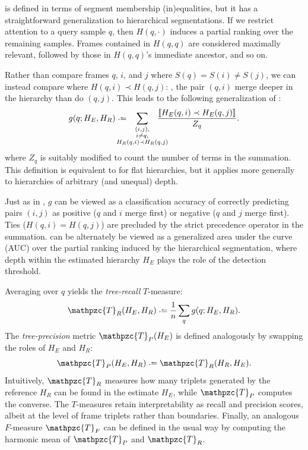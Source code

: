 \documentclass{article}
\def\shag{\ensuremath{\mathpzc{T}}}
\begin{document}
 is defined in terms of segment membership (in)equalities, but it has a straightforward 
generalization to hierarchical segmentations.
If we restrict attention to a query sample $q$, then $H(q, \cdot)$ induces a partial ranking over the remaining samples.
Frames contained in $H(q, q)$ are considered maximally relevant, followed by those in $H(q, q)$'s immediate ancestor, and so on.

Rather than compare frames $q$, $i$, and $j$ where ${S(q) = S(i) \neq S(j)}$, we can instead compare where
$H(q, i) \prec H(q, j)$: \ie, the pair $(q,i)$ merge deeper in the hierarchy than do $(q,j)$.
This leads to the following generalization of :
\begin{equation}
    g(q ; H_E, H_R) \defeq \hspace{-1.5em} \sum_{\substack{(i, j),\\ i \neq q,\\ H_R(q, i) \prec H_R(q, j)}}
    \hspace{-1.5em} \frac{\ind{H_E(q, i) \prec H_E(q, j)}}{Z_q}.\label{hierrecall}
\end{equation}
where $Z_q$ is suitably modified to count the number of terms in the summation.
This definition is equivalent to  for flat hierarchies, but it applies more generally to 
hierarchies of arbitrary (and unequal) depth.

Just as in , $g$ can be viewed as a classification accuracy of correctly predicting pairs $(i, j)$ as positive ($q$ and $i$ merge first) or negative ($q$ and $j$ merge first).
Ties ($H(q, i) = H(q, j)$) are precluded by the strict precedence operator in the summation.
 can be alternately be viewed as a generalized area under the curve (AUC) over the partial
ranking induced by the hierarchical segmentation, where depth within the estimated hierarchy $H_E$ plays the
role of the detection threshold.

Averaging over $q$ yields the \emph{tree-recall} $T$-measure:
\begin{equation}
\shag_R(H_E, H_R) \defeq \frac{1}{n} \sum_q g(q ; H_E, H_R).\label{shagunder}
\end{equation}
The \emph{tree-precision} metric $\shag_P(H_E)$ is defined analogously by swapping the roles of $H_E$ and $H_R$:
\begin{equation}
\shag_P(H_E, H_R) \defeq \shag_R(H_R, H_E).
\end{equation}
Intuitively, $\shag_R$ measures how many triplets generated by the reference $H_R$ can be found in the estimate $H_E$, 
while $\shag_P$ computes the converse.  The $T$-measures retain interpretability as recall and precision scores,
albeit at the level of frame triplets rather than boundaries.  Finally, an analogous $F$-measure $\shag_F$ can 
be defined in the usual way by computing the harmonic mean of $\shag_P$ and $\shag_R$.
\end{document}
